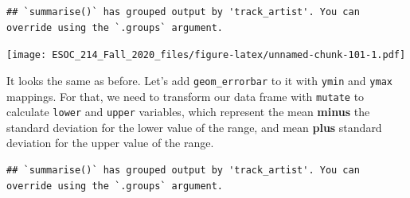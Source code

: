 \documentclass[
]{book}
\newenvironment{Shaded}{\begin{snugshade}}{\end{snugshade}}
\newcommand{\DataTypeTok}[1]{\textcolor[rgb]{0.13,0.29,0.53}{#1}}
\newcommand{\DecValTok}[1]{\textcolor[rgb]{0.00,0.00,0.81}{#1}}
\newcommand{\KeywordTok}[1]{\textcolor[rgb]{0.13,0.29,0.53}{\textbf{#1}}}
\newcommand{\NormalTok}[1]{#1}
\newcommand{\OperatorTok}[1]{\textcolor[rgb]{0.81,0.36,0.00}{\textbf{#1}}}
\newcommand{\StringTok}[1]{\textcolor[rgb]{0.31,0.60,0.02}{#1}}
\begin{document}
\begin{verbatim}
## `summarise()` has grouped output by 'track_artist'. You can override using the `.groups` argument.
\end{verbatim}

\texttt{[image: ESOC\_214\_Fall\_2020\_files/figure-latex/unnamed-chunk-101-1.pdf]}

It looks the same as before. Let's add \texttt{geom\_errorbar} to it with \texttt{ymin} and \texttt{ymax} mappings. For that, we need to transform our data frame with \texttt{mutate} to calculate \texttt{lower} and \texttt{upper} variables, which represent the mean \textbf{minus} the standard deviation for the lower value of the range, and mean \textbf{plus} standard deviation for the upper value of the range.

\begin{Shaded}
\end{Shaded}

\begin{verbatim}
## `summarise()` has grouped output by 'track_artist'. You can override using the `.groups` argument.
\end{verbatim}
\end{document}
